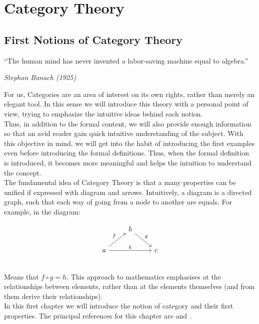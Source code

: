 

\part{Category Theory}
\label{Part1}



\chapter{First Notions of Category Theory}

\epigraph{“The human mind has never invented a labor-saving machine equal to algebra.” }{\textit{Stephan Banach (1925)}}

For us, Categories are an area of interest on its own rights, rather than merely an elegant tool. In this sense we will introduce this theory with a personal point of view, trying to emphasize the intuitive ideas behind each notion.\\

Thus, in addition to the formal content, we will also provide enough information so that an avid reader gain quick intuitive understanding of the subject. With this objective in mind, we will get into the habit of introducing the first examples even before introducing the formal definitions. Thus, when the formal definition is introduced, it becomes more meaningful and helps the intuition to understand the concept.\\

The fundamental idea of Category Theory is that a many properties can be unified if expressed with diagram and arrows. Intuitively, a diagram is a directed graph, such that each way of going from a node to another are equals. For example, in the diagram:

\[
  \begin{tikzcd}
    & b \arrow[rd, "g"]& \\
    a\arrow[ru, "f"] \arrow[rr, "h"] && c\\
  \end{tikzcd}
\]
Means that $f\circ g = h$. This approach to mathematics emphasises  at the relationships between elements, rather than at the elements themselves (and from them derive their relationships).\\

In this first chapter we will introduce the notion of category and their first properties. The principal references for this chapter are \cite{mac2013categories} and \cite{riehl2017category}. 

